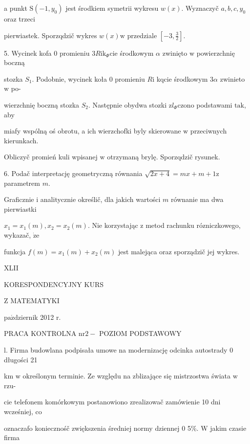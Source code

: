 \documentclass[a4paper,12pt]{article}
\begin{document}
a punkt $\mathrm{S}(-1,y_{0})$ jest środkiem symetrii wykresu $w(x)$. Wyznaczyč $a, b, c, y_{0}$ oraz trzeci

pierwiastek. Sporzqdzič wykres $w(x)\mathrm{w}$ przedziale $[-3,\displaystyle \frac{3}{2}].$

5. Wycinek kofa $0$ promieniu $3R\mathrm{i}\mathrm{k}_{\Phi}\mathrm{c}\mathrm{i}\mathrm{e}$ środkowym $\alpha$ zwinięto $\mathrm{w}$ powierzchnię boczną

stozka $S_{1}$. Podobnie, wycinek koła $0$ promieniu $R\mathrm{i}$ kqcie środkowym $ 3\alpha$ zwinieto $\mathrm{w}$ po-

wierzchnię boczną stozka $S_{2}$. Następnie obydwa stozki $\mathrm{z}l_{\Phi}$czono podstawami $\mathrm{t}\mathrm{a}\mathrm{k}$, aby

miafy wspólną oś obrotu, a ich wierzchofki byly skierowane $\mathrm{w}$ przeciwnych kierunkach.

Obliczyč promień kuli wpisanej $\mathrm{w}$ otrzymaną brylę. Sporzqdzič rysunek.

6. Podač interpretację geometryczną równania $\sqrt{2x+4}=mx+m+1\mathrm{z}$ parametrem $m.$

Graficznie $\mathrm{i}$ analitycznie określič, dla jakich wartości $m$ równanie ma dwa pierwiastki

$x_{1}=x_{1}(m), x_{2}=x_{2}(m)$. Nie korzystając $\mathrm{z}$ metod rachunku rózniczkowego, wykazač, $\dot{\mathrm{z}}\mathrm{e}$

funkcja $f(m)=x_{1}(m)+x_{2}(m)$ jest malejąca oraz sporządzič jej wykres.





XLII

KORESPONDENCYJNY KURS

Z MATEMATYKI

$\mathrm{p}\mathrm{a}\acute{\mathrm{z}}$dziernik 2012 $\mathrm{r}.$

PRACA KONTROLNA $\mathrm{n}\mathrm{r} 2-$ POZIOM PODSTAWOWY

l. Firma budowlana podpisała umowe na modernizację odcinka autostrady $0$ długości 21

km $\mathrm{w}$ określonym terminie. Ze względu na zblizające się mistrzostwa świata $\mathrm{w}$ rzu-

cie telefonem komórkowym postanowiono zrealizowač zamówienie 10 dni wcześniej, co

oznaczafo koniecznośč zwiększenia średniej normy dziennej $0$ 5\%. $\mathrm{W}$ jakim czasie firma
\end{document}
